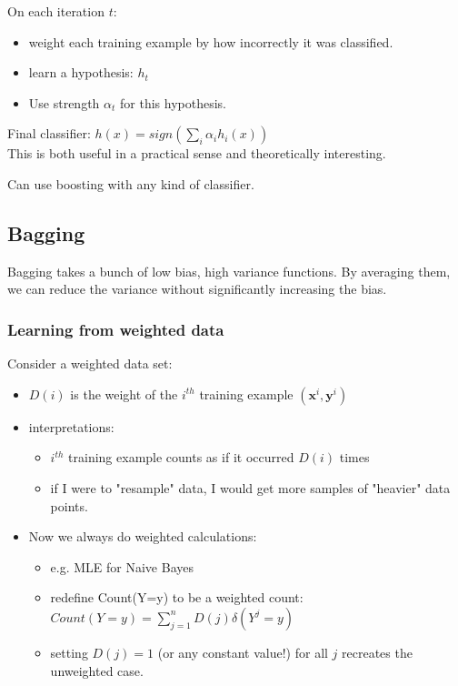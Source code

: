 On each iteration $t$:
\begin{itemize}
	\item weight each training example by how incorrectly it was classified.
	\item learn a hypothesis: $h_t$
	\item Use strength $\alpha_t$ for this hypothesis. 
\end{itemize}
Final classifier: $\displaystyle h(x) = sign \left( \sum_i \alpha_i h_i(x)  \right)$ \hfill \\
This is both useful in a practical sense and theoretically interesting. 

Can use boosting with any kind of classifier.  %

\subsection{Bagging}
Bagging takes a bunch of low bias, high variance functions.
By averaging them, we can reduce the variance without significantly increasing the bias. 

\subsubsection{Learning from weighted data}
Consider a weighted data set: \hfill \\
\begin{itemize}
	\item $D(i)$ is the weight of the $i^{th}$ training example $(\bm{x}^i, \bm{y}^i)$
	\item interpretations:
		\begin{itemize}
			\item $i^{th}$ training example counts as if it occurred $D(i)$ times
			\item if I were to "resample" data, I would get more samples of "heavier" data points. 
		\end{itemize}
	\item Now we always do weighted calculations:
		\begin{itemize}
			\item e.g. MLE for Naive Bayes
			\item redefine Count(Y=y) to be a weighted count: \hfill \\
				$\displaystyle Count(Y=y) = \sum_{j=1}^n D(j) \delta (Y^j = y)$
			\item setting $D(j) = 1$ (or any constant value!) for all $j$ recreates the unweighted case. 
		\end{itemize}
\end{itemize}

